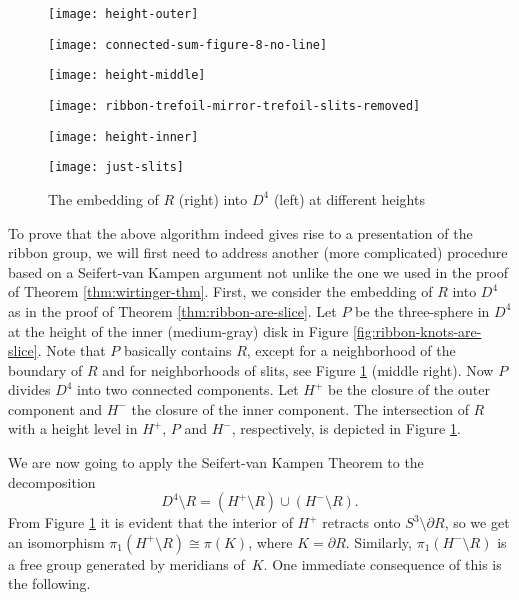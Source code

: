 \documentclass[main.tex]{subfiles}
\begin{document}
\begin{figure}[htb]
\centering
\begin{minipage}{0.5\textwidth}
\centering
\texttt{[image: height-outer]}
\end{minipage}%
\begin{minipage}{0.5\textwidth}
\centering
\texttt{[image: connected-sum-figure-8-no-line]}
\end{minipage}

\begin{minipage}{0.5\textwidth}
\centering
\texttt{[image: height-middle]}
\end{minipage}%
\begin{minipage}{0.5\textwidth}
\centering
\texttt{[image: ribbon-trefoil-mirror-trefoil-slits-removed]}
\end{minipage}

\begin{minipage}{0.5\textwidth}
\centering
\texttt{[image: height-inner]}
\end{minipage}%
\begin{minipage}{0.5\textwidth}
\centering
\texttt{[image: just-slits]}
\end{minipage}
\caption{The embedding of $R$ (right) into $D^4$ (left) at different heights}
\label{fig:embedding-height-levels}
\end{figure}


To prove that the above algorithm indeed gives rise to a presentation of the ribbon group, we will first need to address another (more complicated) procedure based on a Seifert-van Kampen argument not unlike the one we used in the proof of Theorem \ref{thm:wirtinger-thm}. First, we consider the embedding of $R$ into $D^4$ as in the proof of Theorem \ref{thm:ribbon-are-slice}. Let $P$ be the three-sphere in $D^4$ at the height of the inner (medium-gray) disk in Figure \ref{fig:ribbon-knots-are-slice}. Note that $P$ basically contains $R$, except for a neighborhood of the boundary of $R$ and for neighborhoods of slits, see Figure \ref{fig:embedding-height-levels} (middle right). Now $P$ divides $D^4$ into two connected components. Let $H^+$ be the closure of the outer component and $H^-$ the closure of the inner component. The intersection of $R$ with a height level in $H^+$, $P$ and $H^{-}$, respectively, is depicted in Figure \ref{fig:embedding-height-levels}.

We are now going to apply the Seifert-van Kampen Theorem to the decomposition 
$$D^4 \setminus R = (H^+ \setminus R) \cup (H^- \setminus R).$$ From Figure \ref{fig:embedding-height-levels} it is evident that the interior of $H^+$ retracts onto $S^3 \setminus \partial R$, so we get an isomorphism $\pi_1(H^+ \setminus R) \cong \pi(K)$, where $K = \partial R$. Similarly, $\pi_1(H^- \setminus R)$ is a free group generated by meridians of~$K$. One immediate consequence of this is the following.
\end{document}
